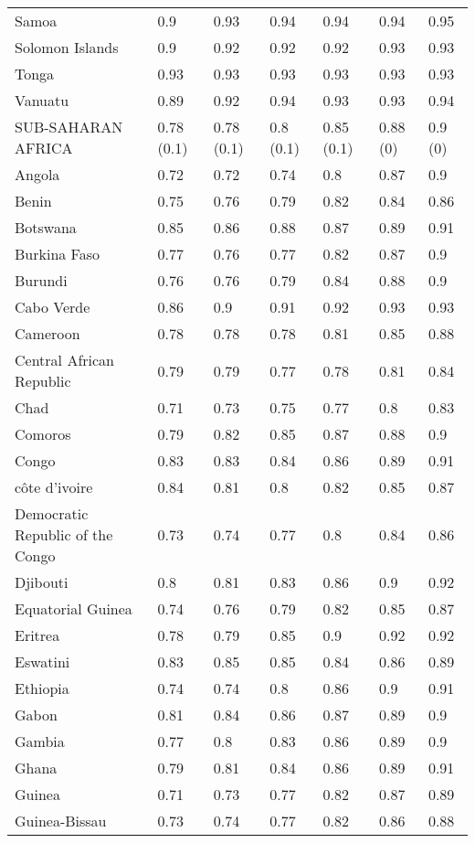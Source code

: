 \begin{longtable}[t]{lllllll}
Samoa & 0.9 & 0.93 & 0.94 & 0.94 & 0.94 & 0.95\\
Solomon Islands & 0.9 & 0.92 & 0.92 & 0.92 & 0.93 & 0.93\\
Tonga & 0.93 & 0.93 & 0.93 & 0.93 & 0.93 & 0.93\\
Vanuatu & 0.89 & 0.92 & 0.94 & 0.93 & 0.93 & 0.94\\
SUB-SAHARAN AFRICA & 0.78 (0.1) & 0.78 (0.1) & 0.8 (0.1) & 0.85 (0.1) & 0.88 (0) & 0.9 (0)\\
Angola & 0.72 & 0.72 & 0.74 & 0.8 & 0.87 & 0.9\\
Benin & 0.75 & 0.76 & 0.79 & 0.82 & 0.84 & 0.86\\
Botswana & 0.85 & 0.86 & 0.88 & 0.87 & 0.89 & 0.91\\
Burkina Faso & 0.77 & 0.76 & 0.77 & 0.82 & 0.87 & 0.9\\
Burundi & 0.76 & 0.76 & 0.79 & 0.84 & 0.88 & 0.9\\
Cabo Verde & 0.86 & 0.9 & 0.91 & 0.92 & 0.93 & 0.93\\
Cameroon & 0.78 & 0.78 & 0.78 & 0.81 & 0.85 & 0.88\\
Central African Republic & 0.79 & 0.79 & 0.77 & 0.78 & 0.81 & 0.84\\
Chad & 0.71 & 0.73 & 0.75 & 0.77 & 0.8 & 0.83\\
Comoros & 0.79 & 0.82 & 0.85 & 0.87 & 0.88 & 0.9\\
Congo & 0.83 & 0.83 & 0.84 & 0.86 & 0.89 & 0.91\\
côte d'ivoire & 0.84 & 0.81 & 0.8 & 0.82 & 0.85 & 0.87\\
Democratic Republic of the Congo & 0.73 & 0.74 & 0.77 & 0.8 & 0.84 & 0.86\\
Djibouti & 0.8 & 0.81 & 0.83 & 0.86 & 0.9 & 0.92\\
Equatorial Guinea & 0.74 & 0.76 & 0.79 & 0.82 & 0.85 & 0.87\\
Eritrea & 0.78 & 0.79 & 0.85 & 0.9 & 0.92 & 0.92\\
Eswatini & 0.83 & 0.85 & 0.85 & 0.84 & 0.86 & 0.89\\
Ethiopia & 0.74 & 0.74 & 0.8 & 0.86 & 0.9 & 0.91\\
Gabon & 0.81 & 0.84 & 0.86 & 0.87 & 0.89 & 0.9\\
Gambia & 0.77 & 0.8 & 0.83 & 0.86 & 0.89 & 0.9\\
Ghana & 0.79 & 0.81 & 0.84 & 0.86 & 0.89 & 0.91\\
Guinea & 0.71 & 0.73 & 0.77 & 0.82 & 0.87 & 0.89\\
Guinea-Bissau & 0.73 & 0.74 & 0.77 & 0.82 & 0.86 & 0.88\\

\end{longtable}
